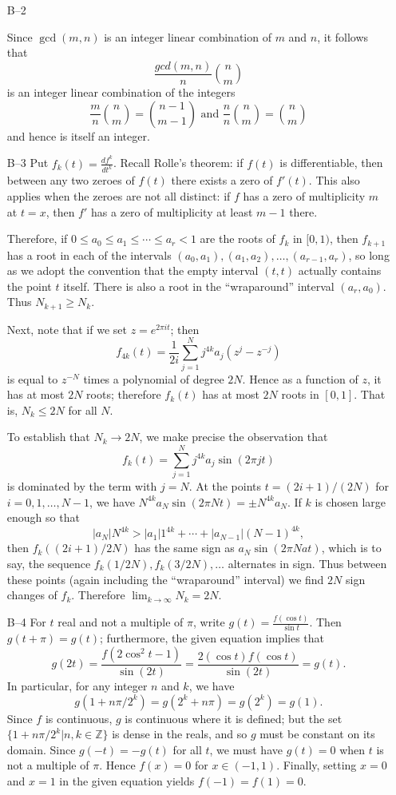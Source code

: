 \documentclass[amssymb,twocolumn,pra,10pt,aps]{revtex4-1}
\begin{document}
\begin{itemize}
\item[B--2]

Since $\gcd(m,n)$ is an integer linear combination of $m$ and $n$,
it follows that
\[\frac{gcd(m,n)}{n}\binom{n}{m}\]
is an integer linear combination of the integers
\[\frac{m}{n}\binom{n}{m}=\binom{n-1}{m-1} \mbox{ and }
\frac{n}{n}\binom{n}{m}=\binom{n}{m} \]
and hence is itself an integer.

\item[B--3]
Put $f_k(t) = \frac{df^k}{dt^k}$.
Recall Rolle's theorem: if $f(t)$ is differentiable, then between any
two zeroes of $f(t)$ there exists a zero of $f'(t)$. This also applies
when the zeroes are not all distinct: if $f$ has a zero of multiplicity
$m$ at $t=x$, then $f'$ has a zero of multiplicity at least $m-1$ there.

Therefore, if $0 \leq a_0 \leq a_1 \leq \cdots \leq a_r < 1$ are the roots
of $f_k$ in $[0,1)$, then $f_{k+1}$ has a root
in each of the intervals $(a_0, a_1), (a_1, a_2), \dots, (a_{r-1}, a_r)$,
so long as we
adopt the convention that the empty interval $(t,t)$ actually contains
the point $t$ itself. There is also a root in the ``wraparound'' interval
$(a_r, a_0)$. Thus $N_{k+1} \geq N_k$.

Next, note that if we set $z = e^{2\pi i t}$; then
\[
f_{4k}(t) = \frac{1}{2i} \sum_{j=1}^N j^{4k} a_j (z^j - z^{-j})
\]
is equal to $z^{-N}$ times a polynomial of degree $2N$. Hence as a
function of $z$, it has at most $2N$ roots; therefore $f_k(t)$ has
at most $2N$ roots in $[0,1]$. That is, $N_k \leq 2N$ for all $N$.

To establish that $N_k \to 2N$, we make precise the observation that
\[
f_k(t) = \sum_{j=1}^N j^{4k} a_j \sin(2\pi j t)
\]
is dominated by the term with $j=N$. At the points
$t = (2i+1)/(2N)$ for $i=0,1, \dots, N-1$, we have
$N^{4k} a_N \sin (2\pi N t) = \pm N^{4k} a_N$. If $k$ is chosen large enough
so that
\[
|a_N| N^{4k} > |a_1| 1^{4k} + \cdots + |a_{N-1}| (N-1)^{4k},
\]
then $f_k((2i+1)/2N)$ has the same sign as $a_N \sin (2\pi N at)$,
which is to say, the sequence $f_k(1/2N), f_k(3/2N), \dots$ alternates
in sign. Thus
between these points (again including the ``wraparound'' interval) we find
$2N$ sign changes of $f_k$. Therefore $\lim_{k \to \infty} N_k = 2N$.


\item[B--4]
For $t$ real and not a multiple of $\pi$, write $g(t) =
\frac{f(\cos t)}{\sin t}$.
Then $g(t+\pi) = g(t)$; furthermore, the given equation implies that
\[
g(2t) = \frac{f(2\cos^2 t - 1)}{\sin (2t)} =
\frac{2(\cos t) f(\cos t)}{\sin(2t)} = g(t).
\]
In particular, for any integer $n$ and $k$, we have
\[
g(1+n\pi/2^k) = g(2^k + n\pi) = g(2^k) = g(1).
\]
Since $f$ is continuous, $g$ is continuous where it is defined;
but the set $\{1+n\pi/2^k | n,k\in{\mathbb{Z}}\}$ is dense
in the reals, and so $g$ must be constant on its domain.
Since $g(-t) = -g(t)$ for all $t$, we must have $g(t) = 0$
when $t$ is not a multiple of $\pi$.
Hence $f(x) = 0$ for $x \in (-1,1)$.  Finally,
setting $x=0$ and $x=1$ in the given equation yields
$f(-1) = f(1) = 0$.



\end{itemize}
\end{document}
